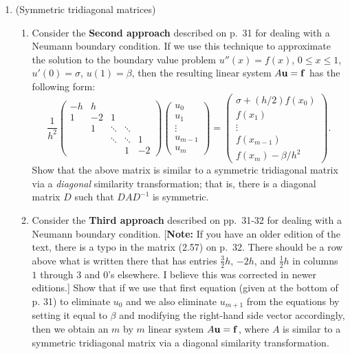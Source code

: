 \documentclass[letterpaper,12pt]{article}
\begin{document}
\begin{enumerate}
\item (Symmetric tridiagonal matrices)
\begin{enumerate}
\item
Consider the {\bf Second approach} described on p.~31 for dealing with
a Neumann boundary condition.  If we use this technique to approximate
the solution to the boundary value problem $u'' (x) = f(x)$, 
$0 \leq x \leq 1$, $u' (0) = \sigma$, $u(1) = \beta$, then the resulting
linear system $A {\bf u} = {\bf f}$ has the following form:
\[
\frac{1}{h^2} \left( \begin{array}{ccccc}
-h & h  &        &        &      \\
1  & -2 & 1      &        &      \\
   & 1  & \ddots & \ddots &      \\
   &    & \ddots & \ddots & 1    \\
   &    &        & 1      & -2 \end{array} \right)
\left( \begin{array}{c} u_0 \\ u_1 \\ \vdots \\ u_{m-1} \\ u_{m} \end{array} 
\right) =
\left( \begin{array}{c} \sigma + (h/2) f( x_0 ) \\ f( x_1 ) \\ \vdots \\ 
f( x_{m-1} ) \\ f( x_m ) - \beta / h^2 \end{array} \right) .
\]
Show that the above matrix is similar to a symmetric tridiagonal matrix 
via a {\em diagonal} similarity transformation; that is, there is a diagonal
matrix $D$ such that $D A D^{-1}$ is symmetric.
\item
Consider the {\bf Third approach} described on pp.~31-32 for dealing with
a Neumann boundary condition.  [{\bf Note:} If you have an older edition of the text,
there is a typo in the matrix (2.57) on p.~32.  There should be a row above what is written
there that has entries $\frac{3}{2} h$, $-2h$, and $\frac{1}{2} h$
in columns $1$ through $3$ and $0$'s elsewhere.  I believe this was corrected in newer editions.]  
Show that if we use that first equation
(given at the bottom of p. 31) to eliminate $u_0$ and we also eliminate
$u_{m+1}$ from the equations by setting it equal to $\beta$ and modifying
the right-hand side vector accordingly, then we obtain an $m$ by $m$
linear system $A {\bf u} = {\bf f}$, where $A$ is similar to a symmetric
tridiagonal matrix via a diagonal similarity transformation.
\end{enumerate}

\end{enumerate}
\end{document}
